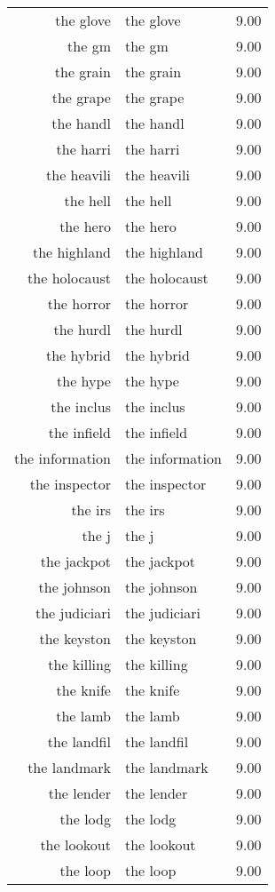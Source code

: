 \begin{table}[ht]
\begin{tabular}{rlr}
  the glove & the glove & 9.00 \\ 
  the gm & the gm & 9.00 \\ 
  the grain & the grain & 9.00 \\ 
  the grape & the grape & 9.00 \\ 
  the handl & the handl & 9.00 \\ 
  the harri & the harri & 9.00 \\ 
  the heavili & the heavili & 9.00 \\ 
  the hell & the hell & 9.00 \\ 
  the hero & the hero & 9.00 \\ 
  the highland & the highland & 9.00 \\ 
  the holocaust & the holocaust & 9.00 \\ 
  the horror & the horror & 9.00 \\ 
  the hurdl & the hurdl & 9.00 \\ 
  the hybrid & the hybrid & 9.00 \\ 
  the hype & the hype & 9.00 \\ 
  the inclus & the inclus & 9.00 \\ 
  the infield & the infield & 9.00 \\ 
  the information & the information & 9.00 \\ 
  the inspector & the inspector & 9.00 \\ 
  the irs & the irs & 9.00 \\ 
  the j & the j & 9.00 \\ 
  the jackpot & the jackpot & 9.00 \\ 
  the johnson & the johnson & 9.00 \\ 
  the judiciari & the judiciari & 9.00 \\ 
  the keyston & the keyston & 9.00 \\ 
  the killing & the killing & 9.00 \\ 
  the knife & the knife & 9.00 \\ 
  the lamb & the lamb & 9.00 \\ 
  the landfil & the landfil & 9.00 \\ 
  the landmark & the landmark & 9.00 \\ 
  the lender & the lender & 9.00 \\ 
  the lodg & the lodg & 9.00 \\ 
  the lookout & the lookout & 9.00 \\ 
  the loop & the loop & 9.00 \\ 

\end{tabular}
\end{table}
